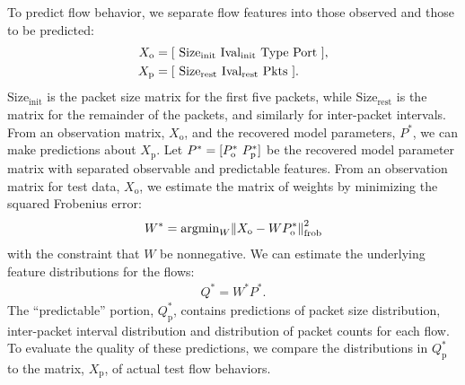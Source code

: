\documentclass{acm_proc_article-sp}
\begin{document}
To predict flow behavior, we separate flow features into those observed and those to be predicted:
\begin{align}
  X_\text{o} &= {\left[ ~
    \text{Size}_\text{init} ~
    \text{Ival}_\text{init} ~
    \text{Type} ~
    \text{Port} ~
  \right]}, \\
  X_\text{p} &= {\left[ ~
    \text{Size}_\text{rest} ~
    \text{Ival}_\text{rest} ~
    \text{Pkts} ~
  \right]}.
\end{align}
$\text{Size}_\text{init}$ is the packet size matrix for the first five packets, while $\text{Size}_\text{rest}$ is the matrix for the remainder of the packets, and similarly for inter-packet intervals.
From an observation matrix, $X_\text{o}$, and the recovered model parameters, $P^*$, we can make predictions about $X_\text{p}$.
Let $P^* = {[P^*_\text{o}~P^*_\text{p}]}$ be the recovered model parameter matrix  with separated observable and predictable features.
From an observation matrix for test data, $X_\text{o}$, we estimate the matrix of weights by minimizing the squared Frobenius error:
\begin{align}
  W^* = \text{argmin}_W {{\left\lVert X_\text{o} - W P^*_\text{o}\right\rVert}^2_\text{frob}}
\end{align}
with the constraint that $W$ be nonnegative.
We can estimate the underlying feature distributions for the flows:
\begin{align}
  Q^* = W^*P^*.
\end{align}
The ``predictable'' portion, $Q^*_\text{p}$, contains predictions of packet size distribution, inter-packet interval distribution and distribution of packet counts for each flow.
To evaluate the quality of these predictions, we compare the distributions in $Q^*_\text{p}$ to the matrix, $X_\text{p}$, of actual test flow behaviors.
\end{document}
